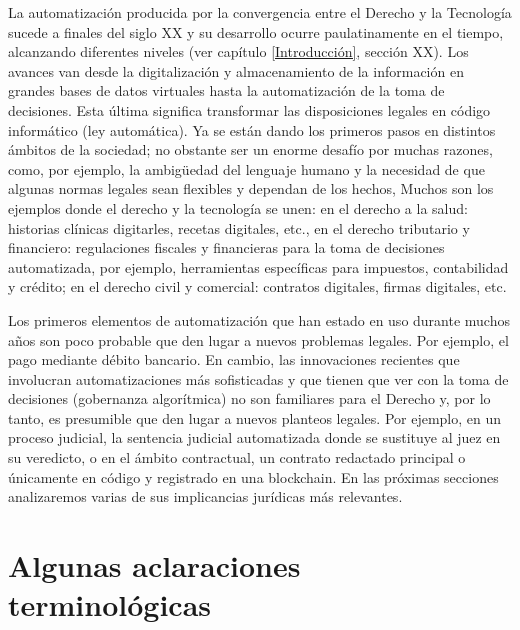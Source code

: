 \documentclass[12pt]{report} %
\begin{document}
La automatización producida por la convergencia entre el Derecho y la Tecnología sucede a finales del siglo XX y su desarrollo ocurre paulatinamente en el tiempo, alcanzando diferentes niveles (ver capítulo \ref{Introducción}, sección XX). Los avances van desde la digitalización y almacenamiento de la información en grandes bases de datos virtuales hasta la automatización de la toma de decisiones. Esta última significa transformar las disposiciones legales en código informático (ley automática). Ya se están dando los primeros pasos en distintos ámbitos de la sociedad; no obstante ser un enorme desafío por muchas razones, como, por ejemplo, la ambigüedad del lenguaje humano y la necesidad de que algunas normas legales sean flexibles y dependan de los hechos, Muchos son los ejemplos donde el derecho y la tecnología se unen: en el derecho a la salud: historias clínicas digitarles, recetas digitales, etc., en el derecho tributario y financiero: regulaciones fiscales y financieras para la toma de decisiones automatizada, por ejemplo, herramientas específicas para impuestos, contabilidad y crédito; en el derecho civil y comercial: contratos digitales, firmas digitales, etc. 

Los primeros elementos de automatización que han estado en uso durante muchos años son poco probable que den lugar a nuevos problemas legales. Por ejemplo, el pago mediante débito bancario. En cambio, las innovaciones recientes que involucran automatizaciones más sofisticadas y que tienen que ver con la toma de decisiones (gobernanza algorítmica) no son familiares para el Derecho y, por lo tanto, es presumible que den lugar a nuevos planteos legales. Por ejemplo, en un proceso judicial, la sentencia judicial automatizada donde se sustituye al juez en su veredicto, o en el ámbito contractual, un contrato redactado principal o únicamente en código y registrado en una blockchain. En las próximas secciones analizaremos varias de sus implicancias jurídicas más relevantes.



\section{Algunas aclaraciones terminológicas}
\end{document}
